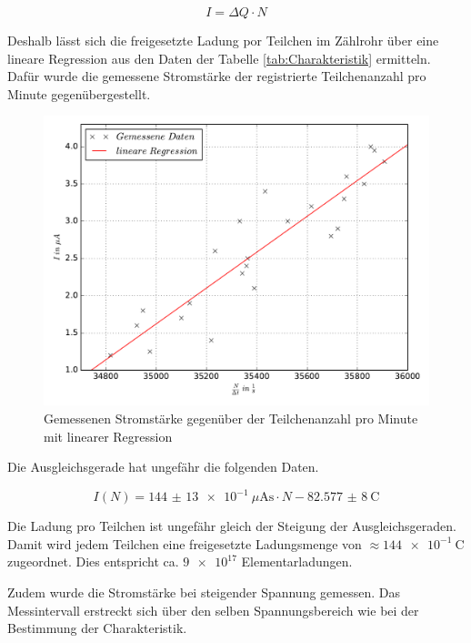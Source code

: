 \begin{equation*}
  I = \Delta Q \cdot N
\end{equation*}

Deshalb lässt sich die freigesetzte Ladung por Teilchen im Zählrohr über eine
lineare Regression aus den Daten der Tabelle \ref{tab:Charakteristik} ermitteln.
Dafür wurde die gemessene Stromstärke der registrierte Teilchenanzahl pro Minute
gegenübergestellt.

\begin{figure}
  \centering
  \includegraphics[width=\textwidth]{Stromstärke_gegen_Anzahl.pdf}
  \caption{Gemessenen Stromstärke gegenüber der Teilchenanzahl pro Minute mit linearer Regression}
  \label{fig:Stromstärke_gegen_Anzahl}
\end{figure}

Die Ausgleichsgerade hat ungefähr die folgenden Daten.

\begin{equation}
  \label{eqn:Augleichsgerade_Ladung}
  I(N) = \SI{144(13)e-1}{\mu\ampere\second}\cdot N - \SI{82,577(8)}{\coulomb}
\end{equation}

Die Ladung pro Teilchen ist ungefähr gleich der Steigung der Ausgleichsgeraden.
Damit wird jedem Teilchen eine freigesetzte Ladungsmenge von $\approx \SI{144e-1}{\coulomb}$
zugeordnet. Dies entspricht ca. $\num{9e17}$ Elementarladungen.

Zudem wurde die Stromstärke bei steigender Spannung gemessen. Das Messintervall
erstreckt sich über den selben Spannungsbereich wie bei der Bestimmung der Charakteristik.

